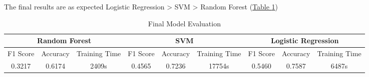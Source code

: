 The final results are as expected Logistic Regression > SVM > Random Forest (\hyperref[tab:Final Model Evaluation]{Table \ref{tab:Final Model Evaluation}})

\begin{table}[htbp]
    \centering
    \begin{tabular}{ccc|ccc|ccc}\toprule
         \multicolumn{3}{c}{Random Forest} &  \multicolumn{3}{|c|}{SVM} &  \multicolumn{3}{c}{Logistic Regression}\\\midrule
         F1 Score&  Accuracy&  Training Time&  F1 Score&  Accuracy&  Training Time&  F1 Score&  Accuracy& Training Time\\
         0.3217&  0.6174&  2409s&  0.4565&  0.7236&  17754s&  0.5460&  0.7587& 6487s\\ \bottomrule
    \end{tabular}
    \caption{Final Model Evaluation}
    \label{tab:Final Model Evaluation}
\end{table}
